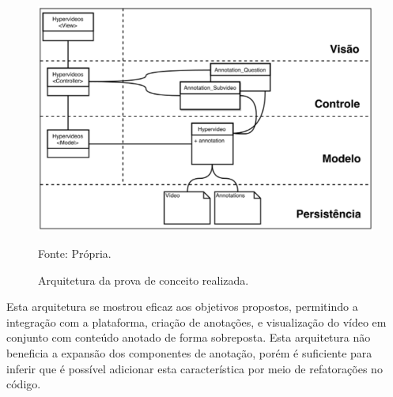 \begin{figure}[h!]
	\centering
  	\includegraphics[width=.7\linewidth]{figuras/arquitetura_simpler.eps}
  	\caption{Arquitetura da prova de conceito realizada.}
	\small{Fonte: Própria.}
  	\label{fig:arquitetura_probe}
\end{figure}

Esta arquitetura se mostrou eficaz aos objetivos propostos, permitindo a integração com a plataforma, criação de anotações, e visualização do vídeo em conjunto com conteúdo anotado de forma sobreposta. Esta arquitetura não beneficia a expansão dos componentes de anotação, porém é suficiente para inferir que é possível adicionar esta característica por meio de refatorações no código. 